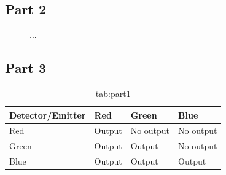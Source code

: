 \subsection{Part 2}

\begin{figure}[H]
    \centering
    \hfill
    \caption{...}
    \label{fig:part2}
\end{figure}

\subsection{Part 3}

\begin{table}[H]
    \centering
    \begin{tabular}{@{}llll@{}}
    \toprule
    Detector/Emitter & Red    & Green     & Blue      \\ \midrule
    Red              & Output & No output & No output \\
    Green            & Output & Output    & No output \\
    Blue             & Output & Output    & Output    \\ \bottomrule
    \end{tabular}
    \caption{tab:part1}
\end{table}